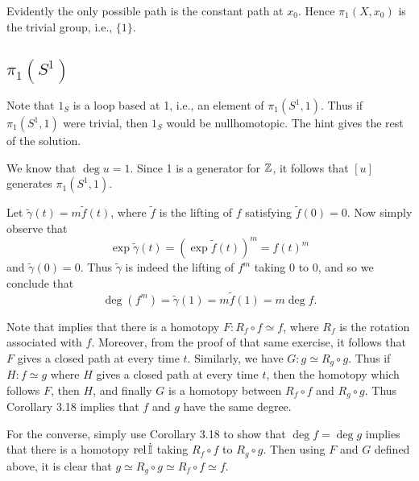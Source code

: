 \documentclass[../../solutions.tex]{subfiles}
\begin{document}
\begin{exercise} \leavevmode
Evidently the only possible path is the constant path at $x_0$. Hence $\pi_1(X,x_0)$ is the trivial group, i.e., $\{1\}$. 
\end{exercise}

\subsection{\texorpdfstring{$\pi_1(S^1)$}{}}
\begin{exercise} \leavevmode
Note that $1_S$ is a loop based at 1, i.e., an element of $\pi_1(S^1,1)$. 
Thus if $\pi_1(S^1,1)$ were trivial, then $1_S$ would be nullhomotopic. 
The hint gives the rest of the solution. 
\end{exercise}

\begin{exercise} \leavevmode
We know that $\deg u=1$. 
Since 1 is a generator for $\mathbb{Z}$, it follows that $[u]$ generates $\pi_1(S^1,1)$. 
\end{exercise}

\begin{exercise} \leavevmode
Let $\tilde\gamma(t)=m\tilde f(t)$, where $\tilde f$ is the lifting of $f$ satisfying $\tilde f(0)=0$. 
Now simply observe that \[\exp\tilde\gamma(t)=\left(\exp\tilde f(t)\right)^m=f(t)^m\] and $\tilde\gamma(0)=0$. 
Thus $\tilde\gamma$ is indeed the lifting of $f^m$ taking 0 to 0, and so we conclude that \[\deg(f^m)=\tilde\gamma(1)=m\tilde f(1)=m\deg f.\]
\end{exercise}

\begin{exercise} \leavevmode
Note that  implies that there is a homotopy $F:R_f\circ f\simeq f$, where $R_f$ is the rotation associated with $f$. 
Moreover, from the proof of that same exercise, it follows that $F$ gives a closed path at every time $t$. 
Similarly, we have $G:g\simeq R_g\circ g$. 
Thus if $H:f\simeq g$ where $H$ gives a closed path at every time $t$, then the homotopy which follows $F$, then $H$, and finally $G$ is a homotopy between $R_f\circ f$ and $R_g\circ g$. 
Thus Corollary 3.18 implies that $f$ and $g$ have the same degree. 

For the converse, simply use Corollary 3.18 to show that $\deg f=\deg g$ implies that there is a homotopy $\operatorname{rel}\dot{\mathbb I}$ taking $R_f\circ f$ to $R_g\circ g$. 
Then using $F$ and $G$ defined above, it is clear that $g\simeq R_g\circ g\simeq R_f\circ f\simeq f$. 
\end{exercise}
\end{document}
